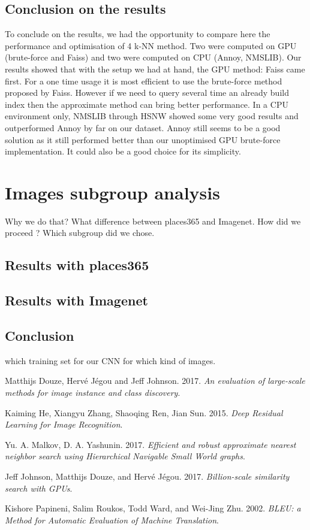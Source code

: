 \documentclass[a4paper]{article}
\begin{document}
\subsection{Conclusion on the results}
	To conclude on the results, we had the opportunity to compare here the performance and optimisation of 4 k-NN method. Two were computed on GPU (brute-force and Faiss) and two were computed on CPU (Annoy, NMSLIB). Our results showed that with the setup we had at hand, the GPU method: Faiss came first. For a one time usage it is most efficient to use the brute-force method proposed by Faiss. However if we need to query several time an already build index then the approximate method can bring better performance. In a CPU environment only, NMSLIB through HSNW showed some very good results and outperformed Annoy by far on our dataset. Annoy still seems to be a good solution as it still performed better than our unoptimised GPU brute-force implementation. It could also be a good choice for its simplicity.

\section{Images subgroup analysis}
	Why we do that? What difference between places365 and Imagenet. How did we proceed ? Which subgroup did we chose.
	
	\subsection{Results with places365}
	\subsection{Results with Imagenet}
	\subsection{Conclusion}
	
	which training set for our CNN for which kind of images.

\begin{thebibliography}{5}

Matthijs Douze, Hervé Jégou and Jeff Johnson. 2017.
\textit{An evaluation of large-scale methods for image instance and class discovery}.

Kaiming He, Xiangyu Zhang, Shaoqing Ren, Jian Sun. 2015.
\textit{Deep Residual Learning for Image Recognition}.

Yu. A. Malkov, D. A. Yashunin. 2017.
\textit{Efficient and robust approximate nearest neighbor search using Hierarchical Navigable Small World graphs}.

Jeff Johnson, Matthijs Douze, and Hervé Jégou. 2017.
\textit{Billion-scale similarity search with GPUs}. 

Kishore Papineni, Salim Roukos, Todd Ward, and Wei-Jing Zhu. 2002.
\textit{BLEU: a Method for Automatic Evaluation of Machine Translation}. 


\end{thebibliography}
\end{document}
